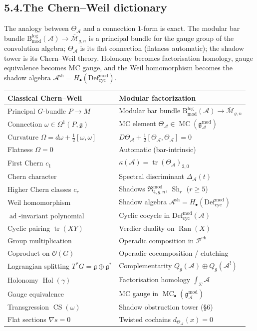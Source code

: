 \documentclass[11pt,reqno]{amsart}
\theoremstyle{definition}
\theoremstyle{remark}
\providecommand{\cA}{\mathcal{A}}
\providecommand{\cM}{\mathcal{M}}
\providecommand{\cO}{\mathcal{O}}
\providecommand{\cP}{\mathcal{P}}
\providecommand{\Defcyc}{\mathrm{Def}_{\mathrm{cyc}}}
\providecommand{\fg}{\mathfrak{g}}
\providecommand{\gAmod}{\mathfrak{g}^{\mathrm{mod}}_\cA}
\providecommand{\Defcyc}{\mathrm{Def}_{\mathrm{cyc}}}
\numberwithin{equation}{section}
\begin{document}
\subsection*{5.4.\enspace The Chern--Weil dictionary}

The analogy between $\Theta_\cA$ and a connection $1$-form is exact.
The modular bar bundle
$\mathrm B^{\log}_{\mathrm{mod}}(\cA)\to\overline{\cM}_{g,n}$ is a
principal bundle for the gauge group of the convolution algebra;
$\Theta_\cA$ is its flat connection (flatness automatic); the shadow
tower is its Chern--Weil theory. Holonomy becomes factorisation
homology, gauge equivalence becomes MC gauge, and the Weil
homomorphism becomes the shadow algebra
$\cA^{\mathrm{sh}}=H_\bullet(\Defcyc^{\mathrm{mod}})$.

\begin{center}
\renewcommand{\arraystretch}{1.25}
\begin{tabular}{ll}
\textbf{Classical Chern--Weil} & \textbf{Modular factorization}\\
\hline
Principal $G$-bundle $P\to M$ & Modular bar bundle $\mathrm B^{\log}_{\mathrm{mod}}(\cA)\to\overline{\cM}_{g,n}$\\[1pt]
Connection $\omega\in\Omega^1(P,\fg)$ & MC element $\Theta_\cA\in\operatorname{MC}(\gAmod)$\\[1pt]
Curvature $\Omega=d\omega+\tfrac12[\omega,\omega]$ & $D\Theta_\cA+\tfrac12[\Theta_\cA,\Theta_\cA]=0$\\[1pt]
Flatness $\Omega=0$ & Automatic (bar-intrinsic)\\[1pt]
First Chern $c_1$ & $\kappa(\cA)=\operatorname{tr}(\Theta_\cA)_{2,0}$\\[1pt]
Chern character & Spectral discriminant $\Delta_\cA(t)$\\[1pt]
Higher Chern classes $c_r$ & Shadows $\mathfrak R^{\mathrm{mod}}_{4,g,n}$, $\operatorname{Sh}_r$ ($r\ge 5$)\\[1pt]
Weil homomorphism & Shadow algebra $\cA^{\mathrm{sh}}=H_\bullet(\Defcyc^{\mathrm{mod}})$\\[1pt]
$\operatorname{ad}$-invariant polynomial & Cyclic cocycle in $\Defcyc^{\mathrm{mod}}(\cA)$\\[1pt]
Cyclic pairing $\operatorname{tr}(XY)$ & Verdier duality on $\operatorname{Ran}(X)$\\[1pt]
Group multiplication & Operadic composition in $\cP^{\mathrm{ch}}$\\[1pt]
Coproduct on $\cO(G)$ & Operadic cocomposition / clutching\\[1pt]
Lagrangian splitting $T^*G=\fg\oplus\fg^*$ & Complementarity $Q_g(\cA)\oplus Q_g(\cA^!)$\\[1pt]
Holonomy $\operatorname{Hol}(\gamma)$ & Factorisation homology $\int_\Sigma\cA$\\[1pt]
Gauge equivalence & MC gauge in $\operatorname{MC}_\bullet(\gAmod)$\\[1pt]
Transgression $\operatorname{CS}(\omega)$ & Shadow obstruction tower (\S6)\\[1pt]
Flat sections $\nabla s=0$ & Twisted cochains $d_{\Theta_\cA}(x)=0$
\end{tabular}
\end{center}
\end{document}
